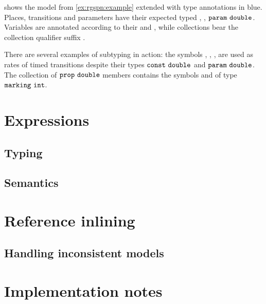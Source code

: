 \begin{runningExample}
   shows the model from \vref{ex:rgspn:example} extended with type annotations in blue. Places, transitions and parameters have their expected typed , , \(\texttt{\upshape param}\ \texttt{\upshape double}\). Variables are annotated according to their  and , while collections bear the collection qualifier suffix \lit{[]}.

  There are several examples of subtyping in action: the symbols , , ,  are used as rates of timed transitions despite their types \(\texttt{\upshape const}\ \texttt{\upshape double}\) and \(\texttt{\upshape param}\ \texttt{\upshape double}\). The collection  of \(\texttt{\upshape prop}\ \texttt{\upshape double}\) members contains the symbols  and  of type \(\texttt{\upshape marking}\ \texttt{\upshape int}\).
\end{runningExample}

\section{Expressions}
\label{sec:rgspn:expression}

\subsection{Typing}

\subsection{Semantics}
\label{ssec:rgspn:semantics}

\section{Reference inlining}
\label{sec:rgspn:inlining}

\subsection{Handling inconsistent models}
\label{ssec:rgspn:inconsistent}

\section{Implementation notes}


